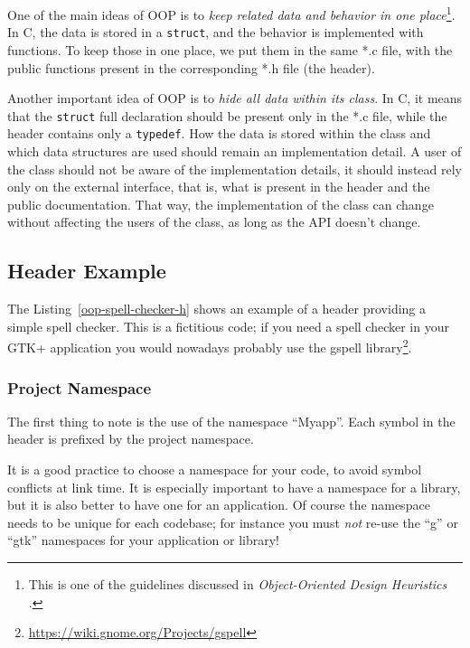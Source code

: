 One of the main ideas of OOP is to \emph{keep related data and behavior in one place}\footnote{This is one of the guidelines discussed in \emph{Object-Oriented Design Heuristics} \cite{oop-book}.}. In C, the data is stored in a \lstinline{struct}, and the behavior is implemented with functions. To keep those in one place, we put them in the same *.c file, with the public functions present in the corresponding *.h file (the header).

Another important idea of OOP is to \emph{hide all data within its class}. In C, it means that the \lstinline{struct} full declaration should be present only in the *.c file, while the header contains only a \lstinline{typedef}. How the data is stored within the class and which data structures are used should remain an implementation detail. A user of the class should not be aware of the implementation details, it should instead rely only on the external interface, that is, what is present in the header and the public documentation. That way, the implementation of the class can change without affecting the users of the class, as long as the API doesn't change.

\subsection{Header Example}

The Listing~\ref{oop-spell-checker-h} shows an example of a header providing a simple spell checker. This is a fictitious code; if you need a spell checker in your GTK+ application you would nowadays probably use the gspell library\footnote{\url{https://wiki.gnome.org/Projects/gspell}}.

\vspace{0.7cm}


\subsubsection{Project Namespace}
The first thing to note is the use of the namespace ``Myapp''. Each symbol in the header is prefixed by the project namespace.

It is a good practice to choose a namespace for your code, to avoid symbol conflicts at link time. It is especially important to have a namespace for a library, but it is also better to have one for an application. Of course the namespace needs to be unique for each codebase; for instance you must \emph{not} re-use the ``g'' or ``gtk'' namespaces for your application or library!

